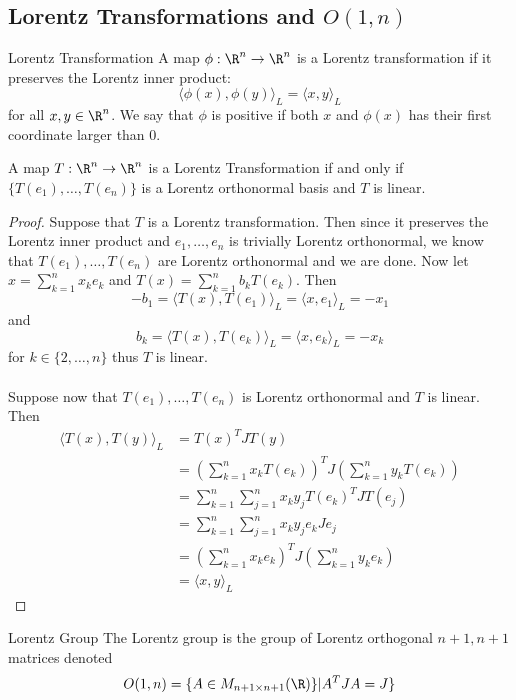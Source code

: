 \subsection{Lorentz Transformations and $O(1,n)$}
\begin{defn}{Lorentz Transformation}{} A map $\phi:\R^n\to\R^n$ is a Lorentz transformation if it preserves the Lorentz inner product: $$\langle\phi(x),\phi(y)\rangle_L=\langle x,y\rangle_L$$ for all $x,y\in\R^n$. We say that $\phi$ is positive if both $x$ and $\phi(x)$ has their first coordinate larger than $0$. 
\end{defn}

\begin{prp}{}{} A map $T:\R^n\to\R^n$ is a Lorentz Transformation if and only if $\{T(e_1),\dots,T(e_n)\}$ is a Lorentz orthonormal basis and $T$ is linear. \tcbline
\begin{proof}
Suppose that $T$ is a Lorentz transformation. Then since it preserves the Lorentz inner product and $e_1,\dots,e_n$ is trivially Lorentz orthonormal, we know that $T(e_1),\dots,T(e_n)$ are Lorentz orthonormal and we are done. Now let $x=\sum_{k=1}^nx_ke_k$ and $T(x)=\sum_{k=1}^nb_kT(e_k)$. Then $$-b_1=\langle T(x),T(e_1)\rangle_L=\langle x,e_1\rangle_L=-x_1$$ and $$b_k=\langle T(x),T(e_k)\rangle_L=\langle x,e_k\rangle_L=-x_k$$ for $k\in\{2,\dots,n\}$ thus $T$ is linear. \\~\\
Suppose now that $T(e_1),\dots,T(e_n)$ is Lorentz orthonormal and $T$ is linear. Then 
\begin{align*}
\langle T(x),T(y)\rangle_L&=T(x)^TJT(y)\\
&=\left(\sum_{k=1}^nx_kT(e_k)\right)^TJ\left(\sum_{k=1}^ny_kT(e_k)\right)\\
&=\sum_{k=1}^n\sum_{j=1}^nx_ky_jT(e_k)^TJT(e_j)\\
&=\sum_{k=1}^n\sum_{j=1}^nx_ky_je_kJe_j\\
&=\left(\sum_{k=1}^nx_ke_k\right)^TJ\left(\sum_{k=1}^ny_ke_k\right)\\
&=\langle x,y\rangle_L
\end{align*}
\end{proof}
\end{prp}

\begin{defn}{Lorentz Group}{} The Lorentz group is the group of Lorentz orthogonal $n+1,n+1$ matrices denoted $$O(1,n)=\{A\in M_{n+1\times n+1}(\R)\}|A^TJA=J\}$$
\end{defn}

